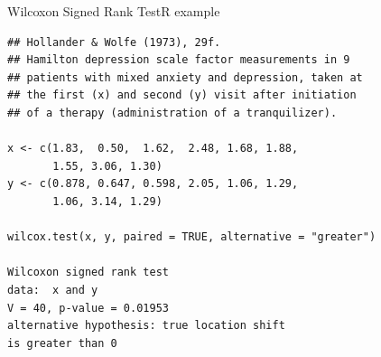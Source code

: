 \begin{frame}[fragile]{Wilcoxon Signed Rank Test}{R example}

{\smaller
\begin{verbatim}
## Hollander & Wolfe (1973), 29f.
## Hamilton depression scale factor measurements in 9
## patients with mixed anxiety and depression, taken at
## the first (x) and second (y) visit after initiation
## of a therapy (administration of a tranquilizer).

x <- c(1.83,  0.50,  1.62,  2.48, 1.68, 1.88,
       1.55, 3.06, 1.30)
y <- c(0.878, 0.647, 0.598, 2.05, 1.06, 1.29,
       1.06, 3.14, 1.29)

wilcox.test(x, y, paired = TRUE, alternative = "greater")

Wilcoxon signed rank test
data:  x and y
V = 40, p-value = 0.01953
alternative hypothesis: true location shift
is greater than 0
\end{verbatim}}
\end{frame}

%
